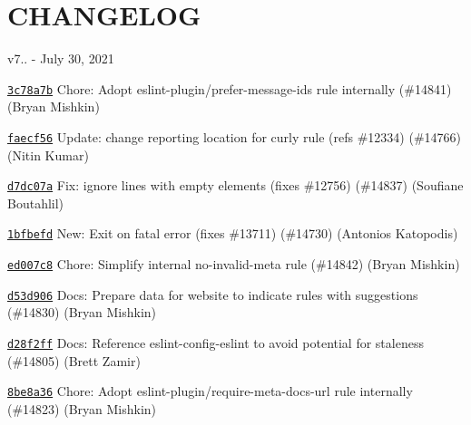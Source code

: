 \chapter{CHANGELOG}
\hypertarget{md__c_1_2_users_2_s_t_r_i_d_e_r_2source_2repos_2_ainslie_a_p_i_2wwwroot_2lib_2jquery-ui_2node__mb205d1c06ec75e4beb698106a29421f5}{}\label{md__c_1_2_users_2_s_t_r_i_d_e_r_2source_2repos_2_ainslie_a_p_i_2wwwroot_2lib_2jquery-ui_2node__mb205d1c06ec75e4beb698106a29421f5}
v7.. -\/ July 30, 2021


\begin{DoxyItemize}
\item \href{https://github.com/eslint/eslint/commit/3c78a7bff6044fd196ae3b737983e6744c6eb7c8}{\texttt{ {\ttfamily 3c78a7b}}} Chore\+: Adopt {\ttfamily eslint-\/plugin/prefer-\/message-\/ids} rule internally (\#14841) (Bryan Mishkin)
\item \href{https://github.com/eslint/eslint/commit/faecf56cdb4146b28bfa4f1980adb41b4d3614b1}{\texttt{ {\ttfamily faecf56}}} Update\+: change reporting location for {\ttfamily curly} rule (refs \#12334) (\#14766) (Nitin Kumar)
\item \href{https://github.com/eslint/eslint/commit/d7dc07a15e256cee9232183165e2f6102f2c0873}{\texttt{ {\ttfamily d7dc07a}}} Fix\+: ignore lines with empty elements (fixes \#12756) (\#14837) (Soufiane Boutahlil)
\item \href{https://github.com/eslint/eslint/commit/1bfbefdaaf19ef32df42b89a3f5d32cff1e5b831}{\texttt{ {\ttfamily 1bfbefd}}} New\+: Exit on fatal error (fixes \#13711) (\#14730) (Antonios Katopodis)
\item \href{https://github.com/eslint/eslint/commit/ed007c82ee9d2170c87500d98303554b5f90b915}{\texttt{ {\ttfamily ed007c8}}} Chore\+: Simplify internal {\ttfamily no-\/invalid-\/meta} rule (\#14842) (Bryan Mishkin)
\item \href{https://github.com/eslint/eslint/commit/d53d9064b9dd0dd6a8ea39e07b16310c8364db69}{\texttt{ {\ttfamily d53d906}}} Docs\+: Prepare data for website to indicate rules with suggestions (\#14830) (Bryan Mishkin)
\item \href{https://github.com/eslint/eslint/commit/d28f2ffb986e49d6da5c1d91215580591f4cfd35}{\texttt{ {\ttfamily d28f2ff}}} Docs\+: Reference eslint-\/config-\/eslint to avoid potential for staleness (\#14805) (Brett Zamir)
\item \href{https://github.com/eslint/eslint/commit/8be8a36010145dfcd31cbdd4f781a91989e3b1bd}{\texttt{ {\ttfamily 8be8a36}}} Chore\+: Adopt {\ttfamily eslint-\/plugin/require-\/meta-\/docs-\/url} rule internally (\#14823) (Bryan Mishkin)

\end{DoxyItemize}
